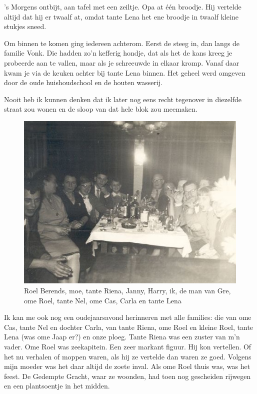 \documentclass[12pt,twoside, openright]{memoir}
\begin{document}
’s Morgens ontbijt, aan tafel met een zeiltje. Opa at één broodje. Hij vertelde altijd dat hij er twaalf at, omdat tante Lena het ene broodje in twaalf kleine stukjes sneed. 

Om binnen te komen ging iedereen achterom. Eerst de steeg in, dan langs de familie Vonk. Die hadden zo’n kefferig hondje, dat als het de kans kreeg je probeerde aan te vallen, maar als je schreeuwde in elkaar kromp. Vanaf daar kwam je via de keuken achter bij tante Lena binnen. Het geheel werd omgeven door de oude huishoudschool en de houten wasserij.  

Nooit heb ik kunnen denken dat ik later nog eens recht tegenover in diezelfde straat zou wonen en de sloop van dat hele blok zou meemaken.

\begin{figure}
\centering
\includegraphics[width=\textwidth]{img/ch1/oudnieuw}
\caption*{\footnotesize Roel Berends, moe, tante Riena, Janny, Harry, ik, de man van Gre, ome Roel, tante Nel, ome Cas, Carla en tante Lena}
\end{figure} 

Ik kan me ook nog een oudejaarsavond herinneren met alle families: die van ome Cas, tante Nel en dochter Carla, van tante Riena, ome Roel en kleine Roel, tante Lena (was ome Jaap er?) en onze ploeg. Tante Riena was een zuster van m’n vader. Ome Roel was zeekapitein. Een zeer markant figuur. Hij kon vertellen. Of het nu verhalen of moppen waren, als hij ze vertelde dan waren ze goed. Volgens mijn moeder was het daar altijd de zoete inval. Als ome Roel thuis was, was het feest. De Gedempte Gracht, waar ze woonden, had toen nog gescheiden rijwegen en een plantsoentje in het midden. 
\end{document}
